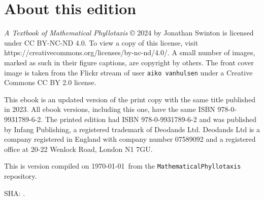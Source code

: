 
\thispagestyle{titlingpage}
{

\chapter*{About this edition}

\textit{A Textbook of Mathematical Phyllotaxis} © 2024 by Jonathan Swinton is licensed under  CC BY-NC-ND 4.0. To view a copy of this license, visit https://creativecommons.org/licenses/by-nc-nd/4.0/.
A small number of images, marked as such in their figure captions, are copyright by others. The front cover image is taken from the Flickr stream of user \texttt{aiko vanhulsen} under a Creative Commons CC BY 2.0 license.

This ebook is an updated version of the print copy with the same title
published in 2023. All ebook versions, including this one, have the same ISBN 978-0-9931789-6-2.
The printed edition had ISBN 978-0-9931789-6-2 and was published by Infang Publishing, a registered trademark of  Deodands Ltd. Deodands Ltd is a company registered in England with company number 07589092 and a registered office at 20-22 Wenlock Road, London N1 7GU.

This is version \jdraftnumber{} compiled on  \today\ from the \texttt{MathematicalPhyllotaxis} repository.

SHA: \jGithubRepoSHA. 

}
\newpage


